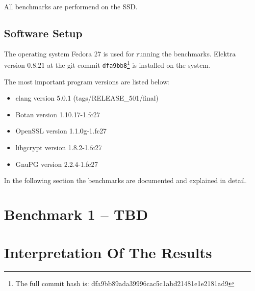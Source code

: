 All benchmarks are performend on the SSD.

  \subsection{Software Setup}

The operating system Fedora 27 is used for running the benchmarks.
Elektra version 0.8.21 at the git commit \texttt{dfa9bb8}\footnote{The full commit hash is: dfa9bb89ada39996cac5c1abd21481e1e2181ad9} is installed on the system.

The most important program versions are listed below:

\begin{itemize}
  \item clang version 5.0.1 (tags/RELEASE\_501/final)
  \item Botan version 1.10.17-1.fc27
  \item OpenSSL version 1.1.0g-1.fc27
  \item libgcrypt version 1.8.2-1.fc27
  \item GnuPG version 2.2.4-1.fc27
\end{itemize}

In the following section the benchmarks are documented and explained in detail.

\section{Benchmark 1 -- TBD}

\section{Interpretation Of The Results}

